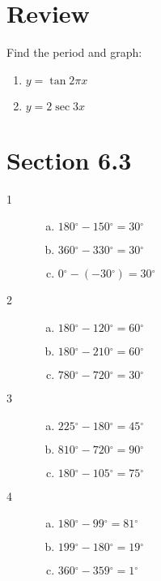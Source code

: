\documentclass{exam}
\newcommand{\dg}{\ensuremath{^\circ}}
\begin{document}
  \fi

  \section{Review}
  Find the period and graph:

  \begin{enumerate}
    \item $y = \tan 2 \pi x$
    \item $y = 2 \sec 3x$
  \end{enumerate}

  \ifprintanswers
    \section{Section 6.3}

    \begin{description}

      \item[1] 
        \begin{enumerate}[(a)]
          \item $180 \dg - 150 \dg = \boxed{ 30 \dg }$
          \item $360 \dg - 330 \dg = \boxed{ 30 \dg }$
          \item $0 \dg - (-30 \dg) = \boxed{ 30 \dg }$
        \end{enumerate}

      \item[2] 
        \begin{enumerate}[(a)]
          \item $180 \dg - 120 \dg = \boxed{ 60 \dg }$
          \item $180 \dg - 210 \dg = \boxed{ 60 \dg }$
          \item $780 \dg - 720 \dg = \boxed{ 30 \dg }$
        \end{enumerate}

      \item[3] 
        \begin{enumerate}[(a)]
          \item $225 \dg - 180 \dg = \boxed{ 45 \dg }$
          \item $810 \dg - 720 \dg = \boxed{ 90 \dg }$
          \item $180 \dg - 105 \dg = \boxed{ 75 \dg }$
        \end{enumerate}

      \item[4] 
        \begin{enumerate}[(a)]
          \item $180 \dg - 99 \dg = \boxed{ 81 \dg }$
          \item $199 \dg - 180 \dg = \boxed{ 19 \dg }$
          \item $360 \dg - 359 \dg = \boxed{ 1 \dg }$
        \end{enumerate}


\end{description}
\end{document}
